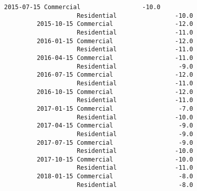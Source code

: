 \documentclass[11pt]{article}
\begin{document}
\begin{Verbatim}[commandchars=\\\{\}]
         2015-07-15 Commercial                 -10.0   
                    Residential                -10.0   
         2015-10-15 Commercial                 -12.0   
                    Residential                -11.0   
         2016-01-15 Commercial                 -12.0   
                    Residential                -11.0   
         2016-04-15 Commercial                 -11.0   
                    Residential                 -9.0   
         2016-07-15 Commercial                 -12.0   
                    Residential                -11.0   
         2016-10-15 Commercial                 -12.0   
                    Residential                -11.0   
         2017-01-15 Commercial                  -7.0   
                    Residential                -10.0   
         2017-04-15 Commercial                  -9.0   
                    Residential                 -9.0   
         2017-07-15 Commercial                  -9.0   
                    Residential                -10.0   
         2017-10-15 Commercial                 -10.0   
                    Residential                -11.0   
         2018-01-15 Commercial                  -8.0   
                    Residential                 -8.0   
         

\end{Verbatim}
\end{document}
